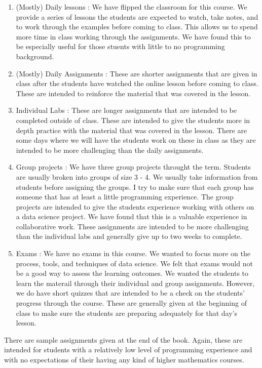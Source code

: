 \documentclass[
  letterpaper,
  DIV=11,
  numbers=noendperiod]{scrreprt}
\begin{document}
\begin{enumerate}
\def\labelenumi{\arabic{enumi}.}
\item
  (Mostly) Daily lessons : We have flipped the classroom for this
  course. We provide a series of lessons the students are expected to
  watch, take notes, and to work through the examples before coming to
  class. This allows us to spend more time in class working through the
  assignments. We have found this to be especially useful for those
  stuents with little to no programming background.
\item
  (Mostly) Daily Assignments : These are shorter assignments that are
  given in class after the students have watched the online lesson
  before coming to class. These are intended to reinforce the material
  that was covered in the lesson.
\item
  Individual Labs : These are longer assignments that are intended to be
  completed outside of class. These are intended to give the students
  more in depth practice with the material that was covered in the
  lesson. There are some days where we will have the students work on
  these in class as they are intended to be more challenging than the
  daily assignments.
\item
  Group projects : We have three group projects throught the term.
  Students are usually broken into groups of size 3 - 4. We usually take
  information from students before assigning the groups. I try to make
  sure that each group has someone that has at least a little
  programming experience. The group projects are intended to give the
  students experience working with others on a data science project. We
  have found that this is a valuable experience in collaborative work.
  These assignments are intended to be more challenging than the
  individual labs and generally give up to two weeks to complete.
\item
  Exams : We have no exams in this course. We wanted to focus more on
  the process, tools, and techniques of data science. We felt that exams
  would not be a good way to assess the learning outcomes. We wanted the
  students to learn the materail through their individual and group
  assignments. However, we do have short quizzes that are intended to be
  a check on the students' progress through the course. These are
  generally given at the beginning of class to make sure the students
  are preparing adequately for that day's lesson.
\end{enumerate}

There are sample assignments given at the end of the book. Again, these
are intended for students with a relatively low level of programming
experience and with no expectations of their having any kind of higher
mathematics courses.
\end{document}
